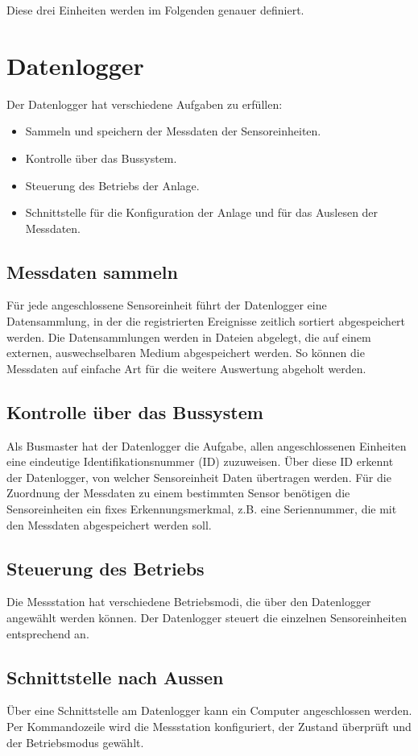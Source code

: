 Diese drei Einheiten werden im Folgenden genauer definiert.

\section{Datenlogger}
Der Datenlogger hat verschiedene Aufgaben zu erfüllen:
\begin{itemize}
\item Sammeln und speichern der Messdaten der Sensoreinheiten.
\item Kontrolle über das Bussystem.
\item Steuerung des Betriebs der Anlage.
\item Schnittstelle für die Konfiguration der Anlage und für das Auslesen der Messdaten.
\end{itemize}


\subsection{Messdaten sammeln}
Für jede angeschlossene Sensoreinheit führt der Datenlogger eine Datensammlung, in der die registrierten Ereignisse zeitlich sortiert abgespeichert werden. Die Datensammlungen werden in Dateien abgelegt, die auf einem externen, auswechselbaren Medium abgespeichert werden. So können die Messdaten auf einfache Art für die weitere Auswertung abgeholt werden.


\subsection{Kontrolle über das Bussystem}
Als Busmaster hat der Datenlogger die Aufgabe, allen angeschlossenen Einheiten eine eindeutige Identifikationsnummer (ID) zuzuweisen. Über diese ID erkennt der Datenlogger, von welcher Sensoreinheit Daten übertragen werden. Für die Zuordnung der Messdaten zu einem bestimmten Sensor benötigen die Sensoreinheiten ein fixes Erkennungsmerkmal, z.B. eine Seriennummer, die mit den Messdaten abgespeichert werden soll.


\subsection{Steuerung des Betriebs}
Die Messstation hat verschiedene Betriebsmodi, die über den Datenlogger angewählt werden können. Der Datenlogger steuert die einzelnen Sensoreinheiten entsprechend an.


\subsection{Schnittstelle nach Aussen}
Über eine Schnittstelle am Datenlogger kann ein Computer angeschlossen werden. Per Kommandozeile wird die Messstation konfiguriert, der Zustand überprüft und der Betriebsmodus gewählt.


